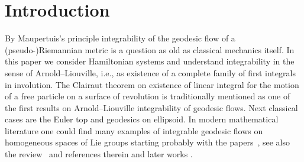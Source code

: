 \documentclass[pdftex]{sigma}
\numberwithin{equation}{section}
\begin{document}


\section{Introduction}

By Maupertuis's principle integrability of the geodesic flow of a (pseudo-)Riemannian metric is a question as old as classical mechanics itself. In this paper we consider Hamiltonian systems and understand integrability in the sense of Arnold--Liouville, i.e., as existence of a complete family of first integrals in involution. The Clairaut theorem on existence of linear integral for the motion of a free particle on a surface of revolution is traditionally mentioned as one of the first results on Arnold--Liouville integrability of geodesic flows. Next classical cases are the Euler top and geodesics on ellipsoid. In modern mathematical literature one could find many examples of integrable geodesic flows on homogeneous spaces of Lie groups starting probably with the papers~\cite{mishch,thimm}, see also the review~\cite{bjObzor} and references therein and later works \cite{DGJ,jovanovic10,mykSuborb,p4}.
\end{document}
